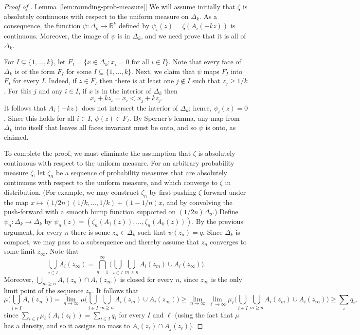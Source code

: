 \documentclass[11pt]{article}
\numberwithin{equation}{section}
\theoremstyle{definition}
\theoremstyle{plain}
\newcommand{\R}{\mathbb R}
\newcommand{\expref}[2]{\hyperref[#2]{#1~\ref{#2}}}
\begin{document}
\begin{proof}[Proof of \expref{Lemma}{lem:rounding-prob-measure}]
  We will assume initially that $\zeta$ is absolutely continuous with respect to the
  uniform measure on $\Delta_k$. As a consequence, the function $\psi: \Delta_k \to \R^k$ defined by
  $\psi_i(z) = \zeta(A_i(-kz))$
  is continuous. Moreover, the image of $\psi$ is in $\Delta_k$, and we need prove that it is all of $\Delta_k$.
  
  For $I \subsetneq \{1, \dots, k\}$, let $F_I = \{x \in \Delta_k: x_i = 0 \text{ for all } i \in I\}$. Note that
  every face of $\Delta_k$ is of the form $F_I$ for some $I \subsetneq \{1, \dots, k\}$.
  Next, we claim that $\psi$ maps $F_I$ into $F_I$ for every $I$. Indeed, if $z \in F_I$ then there is at least one $j \not \in I$
  such that $z_j \ge 1/k$. For this $j$ and any $i \in I$, if $x$ is in the interior of $\Delta_k$ then
  \[
    x_i + k z_i = x_i < x_j + k z_j.
  \]
  It follows that $A_i(-kz)$ does not intersect the interior
  of $\Delta_k$; hence, $\psi_i(z) = 0$. Since this holds for all $i \in I$, $\psi(z) \in F_I$.
  By Sperner's lemma, any map from $\Delta_k$ into itself that leaves all faces invariant must be onto, and so
  $\psi$ is onto, as claimed.

  To complete the proof, we must eliminate the assumption that $\zeta$ is absolutely continuous with
  respect to the uniform measure. For an arbitrary probability measure $\zeta$, let $\zeta_n$ be a sequence of
  probability measures that are absolutely continuous with respect to the uniform measure, and which converge to $\zeta$ in distribution. (For example, we may construct $\zeta_n$ by first pushing $\zeta$ forward under the map $x \mapsto ({1}/{2n}) (1/k, \dots, 1/k) + (1 - 1/n) x$, and by convolving the push-forward with a smooth bump function supported on $({1}/{2n}) \Delta_2$.) Define $\psi_n: \Delta_k \to \Delta_k$
  by $\psi_n(z) = (\zeta_n(A_1(z)), \dots, \zeta_n(A_k(z)))$.
  By the previous argument, for every $n$ there is some $z_n \in \Delta_k$ such that $\psi(z_n) = q$. Since
  $\Delta_k$ is compact, we may pass to a subsequence and thereby assume that $z_n$ converges to some limit $z_\infty$.
  Note that
  \[
    \bigcup_{i \in I} A_i(z_\infty) = \bigcap_{n=1}^\infty \Big(\bigcup_{i \in I} \bigcup_{m \ge n} A_i(z_m) \cup A_i(z_\infty)\Big).
  \]
  Moreover, $\bigcup_{m \ge n} A_i(z_n) \cap A_i(z_\infty)$ is closed for every $n$, since $z_\infty$ is the only
  limit point of the sequence $z_n$. It follows that
  \[
    \mu\Big(\bigcup_{i \in I} A_i(z_\infty)\Big)
    = \lim_{n \to \infty} \mu\Big(\bigcup_{i \in I} \bigcup_{m \ge n} A_i(z_m) \cup A_i(z_\infty)\Big)
    \ge \lim_{n \to \infty} \lim_{\ell \to \infty} \mu_\ell\Big(\bigcup_{i \in I} \bigcup_{m \ge n} A_i(z_m) \cup A_i(z_\infty)\Big)
    \ge \sum_i q_i,
  \]
  since $\sum_{i \in I} \mu_\ell(A_i(z_\ell)) = \sum_{i \in I} q_i$ for every $I$ and $\ell$
  (using the fact that $\mu$ has a density, and so it assigns no mass to $A_i(z_\ell) \cap A_j(z_\ell)$).
  \end{proof}
\end{document}

